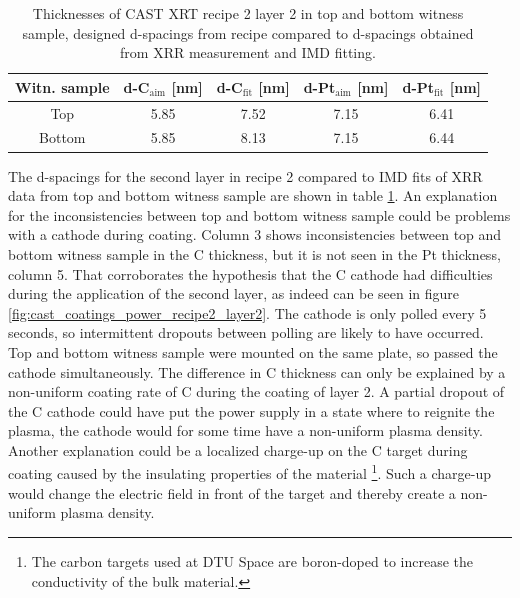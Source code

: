 \begin{table}
  \centering
\begin{tabular}{c|c|c|c|c}
Witn. sample& d-C$_{\text{aim}}$ [nm]&d-C$_{\text{fit}}$ [nm]&d-Pt$_{\text{aim}}$ [nm]&d-Pt$_{\text{fit}}$ [nm]\\
\hline
Top&5.85&7.52&7.15&6.41\\
Bottom&5.85&8.13&7.15&6.44\\
\end{tabular}
\caption{\footnotesize Thicknesses of CAST XRT recipe 2 layer 2 in top and bottom witness sample, designed d-spacings from recipe compared to d-spacings obtained from XRR measurement and IMD fitting.}\label{tab:recipe2layer2}
\end{table}

The d-spacings for the second layer in recipe 2 compared to IMD fits of XRR data from top and bottom witness sample are shown in table \ref{tab:recipe2layer2}. An explanation for the inconsistencies between top and bottom witness sample could be problems with a cathode during coating. Column 3 shows inconsistencies between top and bottom witness sample in the C thickness, but it is not seen in the Pt thickness, column 5. That corroborates the hypothesis that the C cathode had difficulties during the application of the second layer, as indeed can be seen in figure \ref{fig:cast_coatings_power_recipe2_layer2}. The cathode is only polled every 5 seconds, so intermittent dropouts between polling are likely to have occurred. Top and bottom witness sample were mounted on the same plate, so passed the cathode simultaneously. The difference in C thickness can only be explained by a non-uniform coating rate of C during the coating of layer 2. A partial dropout of the C cathode could have put the power supply in a state where to reignite the plasma, the cathode would for some time have a non-uniform plasma density. Another explanation could be a localized charge-up on the C target during coating caused by the insulating properties of the material \footnote{The carbon targets used at DTU Space are boron-doped to increase the conductivity of the bulk material.}. Such a charge-up would change the electric field in front of the target and thereby create a non-uniform plasma density.

